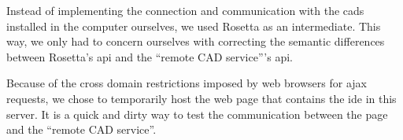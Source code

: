 Instead of implementing the connection and communication with the \glspl{cad} installed in the computer ourselves, we used Rosetta as an intermediate.
This way, we only had to concern ourselves with correcting the semantic differences between Rosetta's \gls{api} and the ``remote CAD service'''s \gls{api}.

Because of the cross domain restrictions imposed by web browsers for \gls{ajax} requests, we chose to temporarily host the web page that contains the \gls{ide} in this server.
It is a quick and dirty way to test the communication between the page and the ``remote CAD service''.





